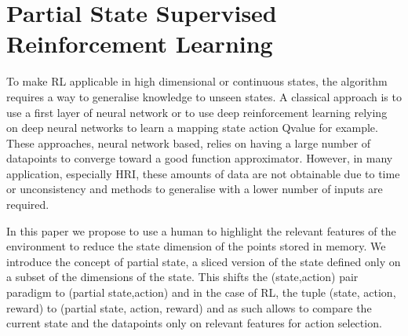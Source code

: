 \documentclass[letterpaper]{article} %
\begin{document}
\section{Partial State Supervised Reinforcement Learning}

To make RL applicable in high dimensional or continuous states, the algorithm
requires a way to generalise knowledge to unseen states. 
A classical approach is to use a first layer of neural
network or to use deep reinforcement learning relying on deep neural
networks to learn a mapping state action Qvalue for example. 
These approaches, neural network based, relies on having a large number of
datapoints to converge toward a good function approximator. However, 
 in many application, especially HRI, these amounts of data are not
obtainable due to time or unconsistency and methods to generalise with a lower
number of inputs are required.


In this paper we propose to use a human to highlight the relevant features of
the environment to reduce the state dimension of the points stored in memory.
We introduce the concept of partial state, a sliced version of the state defined
only on a subset of the dimensions of the state. This shifts the (state,action)
pair paradigm to (partial state,action)  
and in the case of RL, the tuple (state, action, reward) to (partial state,
action, reward) and as such allows to compare the current state and the
datapoints only on relevant features for action selection.
\end{document}
